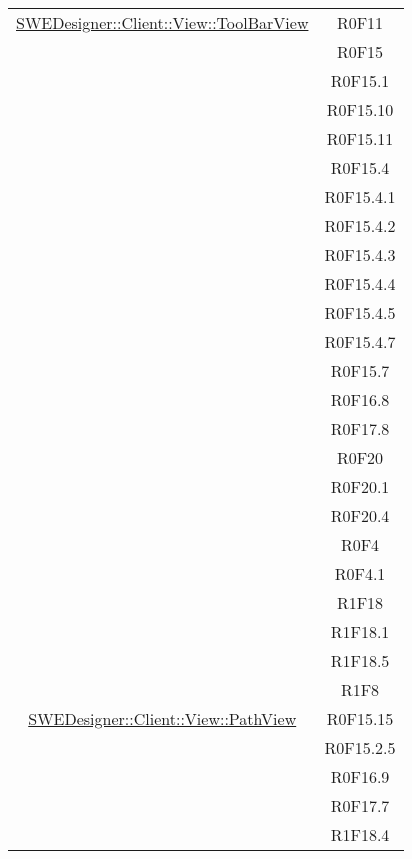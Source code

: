 \documentclass[../DefinizioneDiProdotto.tex]{subfiles}
\begin{document}
\begin{longtable}{|c|c|}
				\hyperlink{SWEDesigner::Client::View::ToolBarView}{SWEDesigner::Client::View::ToolBarView}
				& R0F11\\
				& R0F15\\
				& R0F15.1\\
				& R0F15.10\\
				& R0F15.11\\
				& R0F15.4\\
				& R0F15.4.1\\
				& R0F15.4.2\\
				& R0F15.4.3\\
				& R0F15.4.4\\
				& R0F15.4.5\\
				& R0F15.4.7\\
				& R0F15.7\\
				& R0F16.8\\
				& R0F17.8\\
				& R0F20\\
				& R0F20.1\\
				& R0F20.4\\
				& R0F4\\
				& R0F4.1\\
				& R1F18\\
				& R1F18.1\\
				& R1F18.5\\
				& R1F8\\
				\hline

				\hyperlink{SWEDesigner::Client::View::PathView}{SWEDesigner::Client::View::PathView}
				& R0F15.15\\
				& R0F15.2.5\\
				& R0F16.9\\
				& R0F17.7\\
				& R1F18.4\\
				\hline


\end{longtable}
\end{document}
